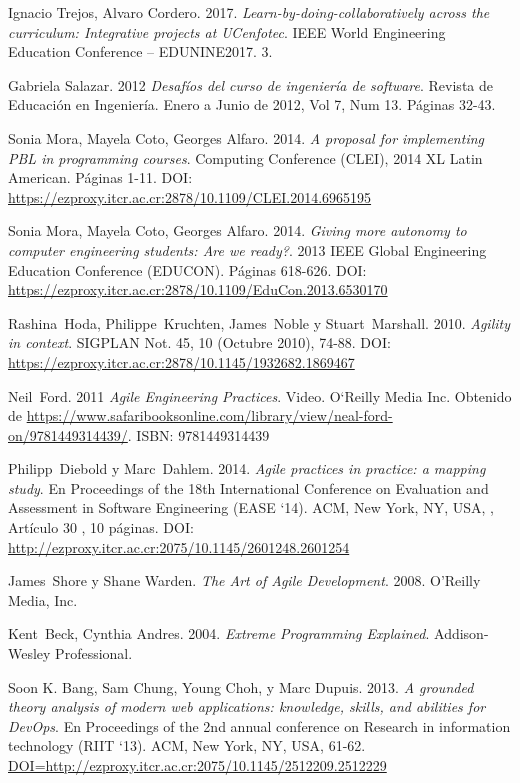 \documentclass[journal]{IEEEtran}
\begin{document}
\begin{thebibliography}{1}
Ignacio Trejos, Alvaro Cordero. 2017. \emph{Learn-by-doing-collaboratively across the curriculum: Integrative projects at UCenfotec}. IEEE World Engineering Education Conference – EDUNINE2017. 3.

Gabriela Salazar. 2012 \emph{Desafíos del curso de ingeniería de software}. Revista de Educación en Ingeniería. Enero a Junio de 2012, Vol 7, Num 13. Páginas 32-43.

Sonia Mora, Mayela Coto, Georges Alfaro. 2014. \emph{A proposal for implementing PBL in programming courses}. Computing Conference (CLEI), 2014 XL Latin American. Páginas 1-11. DOI: \url{https://ezproxy.itcr.ac.cr:2878/10.1109/CLEI.2014.6965195}

Sonia Mora, Mayela Coto, Georges Alfaro. 2014. \emph{Giving more autonomy to computer engineering students: Are we ready?}. 2013 IEEE Global Engineering Education Conference (EDUCON). Páginas 618-626. DOI: \url{https://ezproxy.itcr.ac.cr:2878/10.1109/EduCon.2013.6530170} 

Rashina~Hoda, Philippe~Kruchten, James~Noble y Stuart~Marshall. 2010. \emph{Agility in context}. SIGPLAN Not. 45, 10 (Octubre 2010), 74-88. DOI: \url{https://ezproxy.itcr.ac.cr:2878/10.1145/1932682.1869467}

Neil~Ford. 2011 \emph{Agile Engineering Practices}. Video. O`Reilly Media Inc. Obtenido de \url{https://www.safaribooksonline.com/library/view/neal-ford-on/9781449314439/}. ISBN: 9781449314439

Philipp~Diebold y Marc~Dahlem. 2014. \emph{Agile practices in practice: a mapping study}. En Proceedings of the 18th International Conference on Evaluation and Assessment in Software Engineering (EASE `14). ACM, New York, NY, USA, , Artículo 30 , 10 páginas. DOI: \url{http://ezproxy.itcr.ac.cr:2075/10.1145/2601248.2601254}

James~Shore y Shane Warden. \emph{The Art of Agile Development}. 2008. O'Reilly Media, Inc.

Kent~Beck, Cynthia Andres. 2004. \emph{Extreme Programming Explained}. Addison-Wesley Professional.

Soon K. Bang, Sam Chung, Young Choh, y Marc Dupuis. 2013. \emph{A grounded theory analysis of modern web applications: knowledge, skills, and abilities for DevOps}. En Proceedings of the 2nd annual conference on Research in information technology (RIIT `13). ACM, New York, NY, USA, 61-62. \url{DOI=http://ezproxy.itcr.ac.cr:2075/10.1145/2512209.2512229}


\end{thebibliography}
\end{document}
